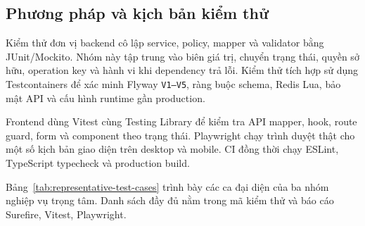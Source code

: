 \documentclass[../DoAn.tex]{subfiles}
\begin{document}
\subsection{Phương pháp và kịch bản kiểm thử}

Kiểm thử đơn vị backend cô lập service, policy, mapper và validator bằng JUnit/Mockito. Nhóm này tập trung vào biên giá trị, chuyển trạng thái, quyền sở hữu, operation key và hành vi khi dependency trả lỗi. Kiểm thử tích hợp sử dụng Testcontainers để xác minh Flyway \texttt{V1--V5}, ràng buộc schema, Redis Lua, bảo mật API và cấu hình runtime gần production.

Frontend dùng Vitest cùng Testing Library để kiểm tra API mapper, hook, route guard, form và component theo trạng thái. Playwright chạy trình duyệt thật cho một số kịch bản giao diện trên desktop và mobile. CI đồng thời chạy ESLint, TypeScript typecheck và production build.

Bảng~\ref{tab:representative-test-cases} trình bày các ca đại diện của ba nhóm nghiệp vụ trọng tâm. Danh sách đầy đủ nằm trong mã kiểm thử và báo cáo Surefire, Vitest, Playwright.
\end{document}
